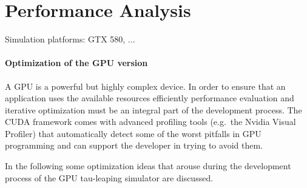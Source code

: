 \section{Performance Analysis}
\label{ch:perf}
Simulation platforms: GTX 580, ...

\paragraph{Optimization of the GPU version} \label{ch:gpuopt} A GPU is a powerful but highly complex device. In order to ensure that an application uses the available resources efficiently performance evaluation and iterative optimization must be an integral part of the development process. The CUDA framework comes with advanced profiling tools (e.g.\ the Nvidia Visual Profiler) that automatically detect some of the worst pitfalls in GPU programming and can support the developer in trying to avoid them. 


In the following some optimization ideas that arouse during the development process of the GPU tau-leaping simulator are discussed. 

